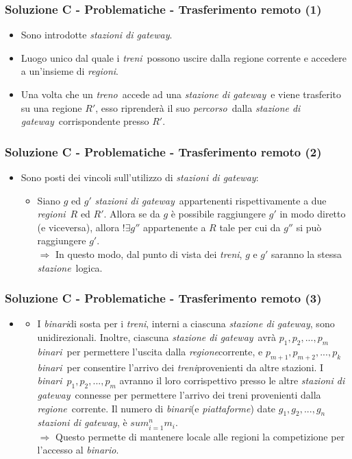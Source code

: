 \documentclass[slidestop,compress,blackandwhite]{beamer}
\newcommand{\ii}[1]{\textit{#1}}
\newcommand{\treno}{\ii{treno}}
\newcommand{\treni}{\ii{treni}}
\newcommand{\stazione}{\ii{stazione}}
\newcommand{\piattaforme}{\ii{piattaforme}}
\newcommand{\binario}{\ii{binario}}
\newcommand{\binari}{\ii{binari}}
\newcommand{\route}{\ii{percorso}}
\newcommand{\regione}{\ii{regione}}
\newcommand{\regioni}{\ii{regioni}}
\newcommand{\gateway}{\ii{stazione di gateway}}
\newcommand{\gateways}{\ii{stazioni di gateway}}
\newcommand{\newframe}[2]{\begin{frame}\frametitle{#1}#2\end{frame}}
\newcommand{\myitemize}[1]{\begin{itemize}#1\end{itemize}}
\begin{document}
	\newframe{Soluzione C - Problematiche - Trasferimento remoto (1)}{
		\vspace{0.5cm}
		\myitemize{
			\item Sono introdotte \gateways.
			\item Luogo unico dal quale i \treni~possono uscire dalla regione corrente e accedere a un'insieme di \regioni.
			\item Una volta che un \treno~accede ad una \gateway~e viene trasferito su una regione $R'$, esso riprenderà il suo \route~dalla \gateway~corrispondente presso $R'$. 
		}
	}
	
	\newframe{Soluzione C - Problematiche - Trasferimento remoto (2)}{
		\vspace{0.5cm}
		\myitemize{
			\item Sono posti dei vincoli sull'utilizzo di \gateways:
				\myitemize{
					\item Siano $g$ ed $g'$ \gateways~appartenenti rispettivamente a due \regioni~$R$ ed $R'$. Allora se da $g$ è possibile raggiungere $g'$ in modo diretto (e viceversa), allora $!\exists g''$ appartenente a $R$ tale per cui da $g''$ si può raggiungere $g'$.\\
					$\Rightarrow$ In questo modo, dal punto di vista dei \treni, $g$ e $g'$ saranno la stessa \stazione~logica.
				
				}
		}
	}
	
	\newframe{Soluzione C - Problematiche - Trasferimento remoto (3)}{
		\vspace{0.5cm}
		\myitemize{
			\item[] 
				\myitemize{
					\item I \binari di sosta per i \treni, interni a ciascuna \gateway, sono unidirezionali. Inoltre, ciascuna \gateway~avrà $p_1,p_2,...,p_m$ \binari~per permettere l'uscita dalla \regione corrente, e $p_{m+1},p_{m+2},...,p_k$ \binari~per consentire l'arrivo dei \treni provenienti da altre stazioni. I \binari~$p_1,p_2,...,p_m$ avranno il loro corrispettivo presso le altre \gateways~connesse per permettere l'arrivo dei treni provenienti dalla \regione~corrente. Il numero di \binari (e \piattaforme) date  $g_1,g_2,...,g_n$ \gateways, è $sum_{i=1}^{n} m_i$.\\
						$\Rightarrow$ Questo permette di mantenere locale alle regioni la competizione per l'accesso al \binario.	
				}
		}	
	}	
		
\end{document}
